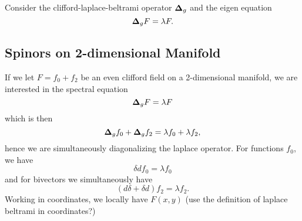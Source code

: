 Consider the clifford-laplace-beltrami operator $\boldsymbol{\Delta}_g$ and the eigen equation
\[
\boldsymbol{\Delta}_g F = \lambda F.
\]

\subsection{Spinors on 2-dimensional Manifold}

If we let $F=f_0+f_2$ be an even clifford field on a 2-dimensional manifold, we are interested in the spectral equation
\[
\boldsymbol{\Delta}_g F = \lambda F
\]
which is then
\[
\boldsymbol{\Delta}_g f_0 + \boldsymbol{\Delta}_g f_2 = \lambda f_0 + \lambda f_2,
\]
hence we are simultaneously diagonalizing the laplace operator.  For functions $f_0$, we have
\[
\delta d f_0 = \lambda f_0
\]
and for bivectors we simultaneously have
\[
(d\delta +\delta d)f_2 = \lambda f_2.
\]
Working in coordinates, we locally have $F(x,y)$ (use the definition of laplace beltrami in coordinates?) 